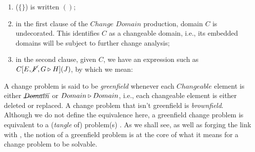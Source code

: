 \documentclass[runningheads,a4paper]{llncs}
\begin{document}
\begin{enumerate}
	\item ($\{\}$) is written $()$; 
	\item in the first clause of the $Change$ $Domain$ production, domain $C$ is undecorated. This identifies $C$ as a changeable domain, i.e., its embedded domains will be subject to further change analysis;
	\item in the second clause, given $C$, we have an expression such as $C[E, \cancel{F}, G\triangleright H](J)$, by which we mean:
\end{enumerate}


A change problem is said to be \textit{greenfield} whenever each $Changeable$ element is either $\cancel{Domain}$ or $Domain\triangleright Domain$, i.e., each changeable element is either deleted or replaced. A change problem that isn't greenfield is \textit{brownfield}. Although we do not define the equivalence here, a greenfield change problem is equivalent to a (\textit{tangle} of) \POE{} problem(s) \cite{hall2016a-design}. As we shall see, as well as forging the link with \POE{}, the notion of a greenfield problem is at the core of what it means for a change problem to be solvable.

\newcommand\zerothCP{E\Delta F\meets_G N}
\newcommand\firstCP{[\Java,\ColourMaker{}]\Delta \ColourMaker{}[CM[\cancel{\alpha}, \cancel{R},\cancel{G},\cancel{B}](\alpha RGB)]()\meets_G RTDNeed}
%
\end{document}
